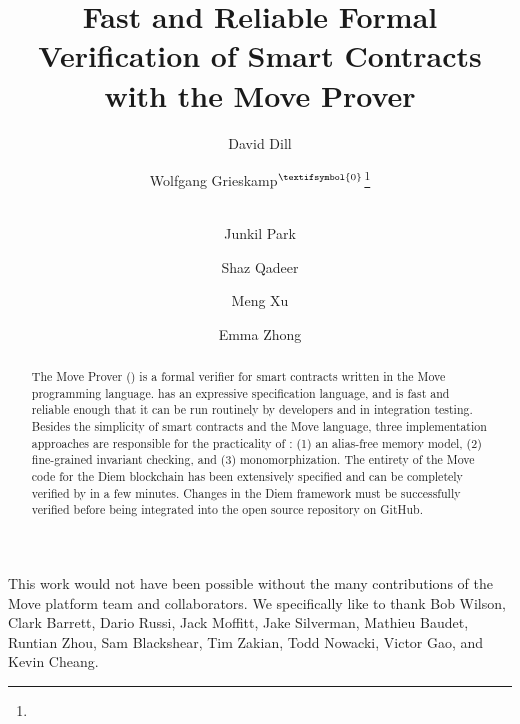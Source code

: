 \documentclass[runningheads,openbib]{llncs}
\begin{document}
\author{
  David Dill \and Wolfgang Grieskamp$^{\textrm{\textifsymbol{0}}}$\thanks{\mailname {}} \and \\ Junkil
  Park \and Shaz Qadeer \and Meng Xu \and Emma Zhong
}


\title{Fast and Reliable Formal Verification of Smart Contracts with the Move Prover}

\maketitle
\begin{abstract}
  The Move Prover (\MVP) is a formal verifier for smart contracts written in the
  Move programming language. \MVP has an expressive specification language, and
  is fast and reliable enough that it can be run routinely by developers and in
  integration testing.  Besides the simplicity of smart contracts and the Move
  language, three implementation approaches are responsible for the practicality
  of \MVP: (1) an alias-free memory model, (2) fine-grained invariant checking,
  and (3) monomorphization.  The entirety of the Move code for the Diem
  blockchain has been extensively specified and can be completely verified by
  \MVP in a few minutes. Changes in the Diem framework must be successfully
  verified before being integrated into the open source repository on GitHub.
\end{abstract}









This work would not have been possible without the many contributions of the
Move platform team and collaborators.  We specifically like to thank Bob Wilson,
Clark Barrett, Dario Russi, Jack Moffitt, Jake Silverman, Mathieu Baudet,
Runtian Zhou, Sam Blackshear, Tim Zakian, Todd Nowacki, Victor Gao, and Kevin
Cheang.

\appendix
\newpage


\end{document}

